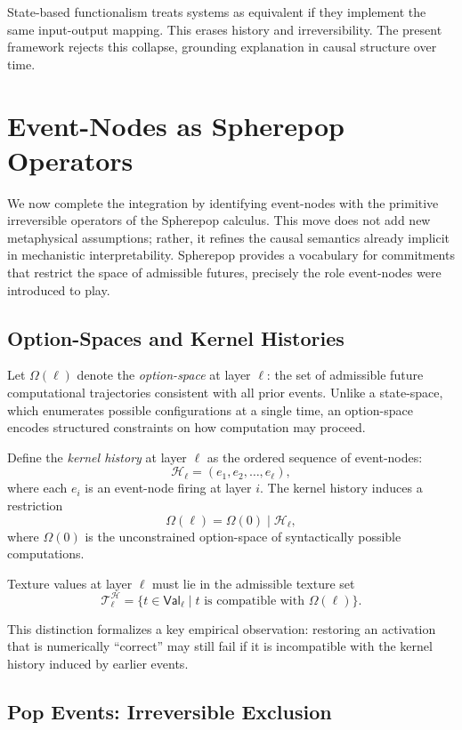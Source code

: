 \documentclass[11pt]{article}
\theoremstyle{remark}
\newcommand{\Hist}{\mathcal{H}}
\newcommand{\Val}{\mathsf{Val}}
\begin{document}
State-based functionalism treats systems as equivalent if they implement the same input-output mapping. This erases history and irreversibility. The present framework rejects this collapse, grounding explanation in causal structure over time.


\section{Event-Nodes as Spherepop Operators}

We now complete the integration by identifying event-nodes with the
primitive irreversible operators of the Spherepop calculus. This move
does not add new metaphysical assumptions; rather, it refines the
causal semantics already implicit in mechanistic interpretability.
Spherepop provides a vocabulary for commitments that restrict the space
of admissible futures, precisely the role event-nodes were introduced
to play.

\subsection{Option-Spaces and Kernel Histories}

Let $\Omega(\ell)$ denote the \emph{option-space} at layer $\ell$:
the set of admissible future computational trajectories consistent
with all prior events. Unlike a state-space, which enumerates possible
configurations at a single time, an option-space encodes structured
constraints on how computation may proceed.

Define the \emph{kernel history} at layer $\ell$ as the ordered sequence
of event-nodes:
\[
\Hist_\ell = (e_1, e_2, \ldots, e_\ell),
\]
where each $e_i$ is an event-node firing at layer $i$.
The kernel history induces a restriction
\[
\Omega(\ell) = \Omega(0) \mid \Hist_\ell,
\]
where $\Omega(0)$ is the unconstrained option-space of syntactically
possible computations.

Texture values at layer $\ell$ must lie in the admissible texture set
\[
\mathcal{T}_\ell^{\Hist} = \{ t \in \Val_\ell \mid t \text{ is compatible with } \Omega(\ell) \}.
\]

This distinction formalizes a key empirical observation: restoring an
activation that is numerically ``correct'' may still fail if it is
incompatible with the kernel history induced by earlier events.

\subsection{Pop Events: Irreversible Exclusion}
\end{document}
